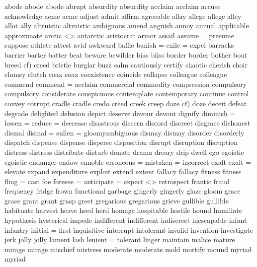abode  
abode  
abode  
abrupt   
absurdity  
absurdity  
acclaim  
acclaim  
accuse  
acknowledge   
acme  
acme  
adjust   
admit   
affirm   
agreeable   
allay  
allege   
allege  
alley 
allot  
ally   
altruistic  
altruistic  
ambiguous  
amend   
anguish   
annoy   
annual  
applicable   
approximate   
arctic <> antarctic  
aristocrat   
armor  
assail   
assume = presume = suppose  
athlete   
attest   
avid   
awkward   
baffle   
banish = exile = expel  
barracks   
barrier   
barter   
batter   
beat   
beware   
bewilder   
bias   
bliss   
border  
border  
bother   
bout  
breed  cf) creed  
bristle   
burglar   
buzz  
calm   
cautiously  
certify   
chaotic   
cherish   
choir  
clumsy   
clutch   
coax  
coax  
coexistence   
coincide   
collapse  
colleague  
colleague  
commend  
commend = acclaim  
commercial  
commodity   
compression   
compulsory  
compulsory  
considerate   
conspicuous  
contemplate   
contemporary  
continue   
control   
convey   
corrupt   
cradle  
cradle  
credo   
creed   
creek   
creep   
daze cf) doze   
deceit   
defeat  
degrade   
delighted   
delusion  
depict   
deserve   
devour   
devout   
dignify   
diminish = lessen = reduce = decrease  
disastrous   
discern   
discord   
discreet   
disgrace 
dishonest  
dismal   
dismal = sullen = gloomyambiguous  
dismay   
dismay  
disorder   
disorderly   
dispatch   
dispense  
dispense  
disperse  
disposition   
disrupt   
disruption  
disruption  
distress   
distress  
distribute  
disturb   
donate   
drama  
dreary   
drip   
dwell   
ego  
egoistic  
egoistic  
endanger  
endow   
ennoble  
erroneous = mistaken = incorrect  
exalt   
exalt = elevate  
expand   
expenditure   
exploit   
extend   
extent   
fallacy  
fallacy  
fitness   
fitness   
fling = cast   
foe  
foresee = anticipate = expect <> retrospect  
frantic   
fraud   
frequency   
fridge   
frown   
functional   
garbage   
gingerly  
gingerly  
glaze   
gloom   
grace  
grace  
grant  
grant  
grasp   
greet  
gregarious  
gregarious  
grieve   
gullible  
gullible  
habituate   
harvest   
heave   
heed   
herd   
homage   
hospitable   
hostile   
hound   
humiliate  
hypothesis  
hysterical   
impede  
indifferent  
indifferent  
indiscreet   
inescapable   
infant   
infantry  
initial = first  
inquisitive   
interrupt   
intolerant   
invalid  
invention  
investigate   
jerk   
jolly   
jolly  
lament   
lash   
lenient = tolerant  
linger  
maintain   
malice   
mature   
mirage  
mirage  
mischief  
mistress  
moderate  
moderate  
mold   
mortify  
mound   
myriad  
myriad  
